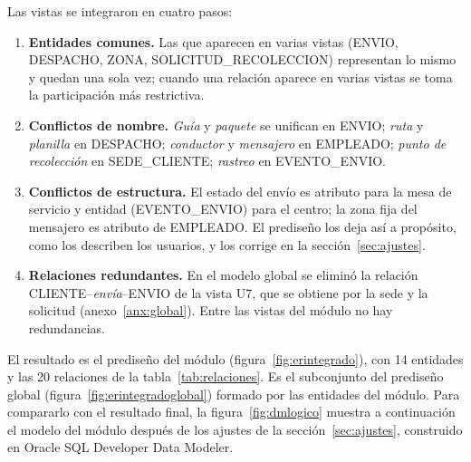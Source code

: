 Las vistas se integraron en cuatro pasos:

\begin{enumerate}[label=\arabic*.,leftmargin=1.2cm,itemsep=2pt]
  \item \textbf{Entidades comunes.} Las que aparecen en varias vistas
        (ENVIO, DESPACHO, ZONA, SOLICITUD\_RECOLECCION) representan lo
        mismo y quedan una sola vez; cuando una relación aparece en
        varias vistas se toma la participación más restrictiva.
  \item \textbf{Conflictos de nombre.} \textit{Guía} y \textit{paquete}
        se unifican en ENVIO; \textit{ruta} y \textit{planilla} en
        DESPACHO; \textit{conductor} y \textit{mensajero} en EMPLEADO;
        \textit{punto de recolección} en SEDE\_CLIENTE; \textit{rastreo}
        en EVENTO\_ENVIO.
  \item \textbf{Conflictos de estructura.} El estado del envío es
        atributo para la mesa de servicio y entidad (EVENTO\_ENVIO) para
        el centro; la zona fija del mensajero es atributo de EMPLEADO. El
        prediseño los deja así a propósito, como los describen los
        usuarios, y los corrige en la sección~\ref{sec:ajustes}.
  \item \textbf{Relaciones redundantes.} En el modelo global se eliminó
        la relación CLIENTE--\textit{envía}--ENVIO de la vista U7, que se
        obtiene por la sede y la solicitud (anexo~\ref{anx:global}). Entre
        las vistas del módulo no hay redundancias.
\end{enumerate}

El resultado es el prediseño del módulo (figura~\ref{fig:erintegrado}),
con 14 entidades y las 20 relaciones de la tabla~\ref{tab:relaciones}.
Es el subconjunto del prediseño global (figura~\ref{fig:erintegradoglobal})
formado por las entidades del módulo. Para compararlo con el resultado final, la
figura~\ref{fig:dmlogico} muestra a continuación el modelo del módulo
después de los ajustes de la sección~\ref{sec:ajustes}, construido en
Oracle SQL Developer Data Modeler.

